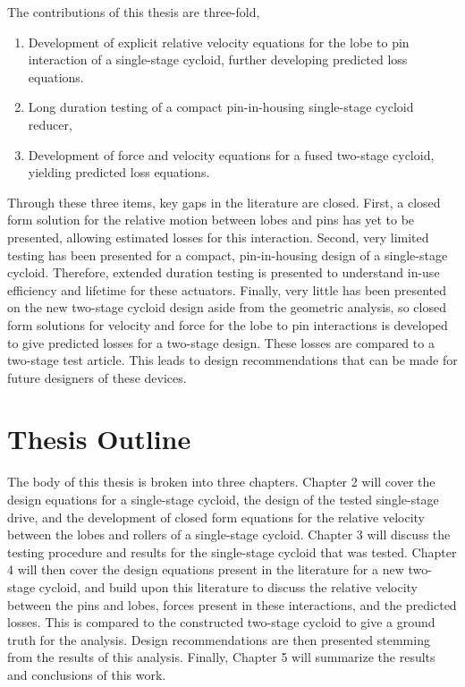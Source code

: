 The contributions of this thesis are three-fold,
\begin{enumerate}
	\item Development of explicit relative velocity equations for the lobe to pin interaction of a single-stage cycloid, further developing predicted loss equations.
	\item Long duration testing of a compact pin-in-housing single-stage cycloid reducer,
	\item Development of force and velocity equations for a fused two-stage cycloid, yielding predicted loss equations. 
\end{enumerate}
Through these three items, key gaps in the literature are closed. First, a closed form solution for the relative motion between lobes and pins has yet to be presented, allowing estimated losses for this interaction. Second, very limited testing has been presented for a compact, pin-in-housing design of a single-stage cycloid. Therefore, extended duration testing is presented to understand in-use efficiency and lifetime for these actuators. Finally, very little has been presented on the new two-stage cycloid design aside from the geometric analysis, so closed form solutions for velocity and force for the lobe to pin interactions is developed to give predicted losses for a two-stage design. These losses are compared to a two-stage test article. This leads to design recommendations that can be made for future designers of these devices. 

\section{Thesis Outline} \label{intro:outline}
The body of this thesis is broken into three chapters. Chapter 2 will cover the design equations for a single-stage cycloid, the design of the tested single-stage drive, and the development of closed form equations for the relative velocity between the lobes and rollers of a single-stage cycloid. Chapter 3 will discuss the testing procedure and results for the single-stage cycloid that was tested. Chapter 4 will then cover the design equations present in the literature for a new two-stage cycloid, and build upon this literature to discuss the relative velocity between the pins and lobes, forces present in these interactions, and the predicted losses. This is compared to the constructed two-stage cycloid to give a ground truth for the analysis. Design recommendations are then presented stemming from the results of this analysis. Finally, Chapter 5 will summarize the results and conclusions of this work. 
